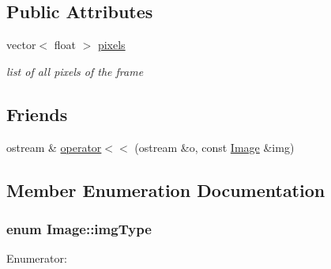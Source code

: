 \subsection*{Public Attributes}
\begin{DoxyCompactItemize}
\item 
vector$<$ float $>$ \hyperlink{class_image_ac22dddb0c4b1136c745f0dce6db7a1dc}{pixels}
\begin{DoxyCompactList}\small\item\em list of all pixels of the frame \end{DoxyCompactList}\end{DoxyCompactItemize}
\subsection*{Friends}
\begin{DoxyCompactItemize}
\item 
ostream \& \hyperlink{class_image_a514d99877d9fdcfed14a8df1cc4237c7}{operator$<$$<$} (ostream \&o, const \hyperlink{class_image}{Image} \&img)
\end{DoxyCompactItemize}


\subsection{Member Enumeration Documentation}
\hypertarget{class_image_a053e7160b6567c4929de1cae9a911581}{
\subsubsection[{img\-Type}]{\setlength{\rightskip}{0pt plus 5cm}enum {\bf Image\-::img\-Type}}}\label{class_image_a053e7160b6567c4929de1cae9a911581}
\begin{Desc}
\item[Enumerator\-: ]\par
\begin{description}
\item[{\em 
\hypertarget{class_image_a053e7160b6567c4929de1cae9a911581a28e925c2b797f2443b8732f42093f632}{I\-M\-G\-\_\-\-G\-R\-A\-Y}\label{class_image_a053e7160b6567c4929de1cae9a911581a28e925c2b797f2443b8732f42093f632}
}]\item[{\em 
\hypertarget{class_image_a053e7160b6567c4929de1cae9a911581a9a4b55aceff11e487f46b51cad901247}{I\-M\-G\-\_\-\-C\-L\-R}\label{class_image_a053e7160b6567c4929de1cae9a911581a9a4b55aceff11e487f46b51cad901247}
}]\end{description}
\end{Desc}



